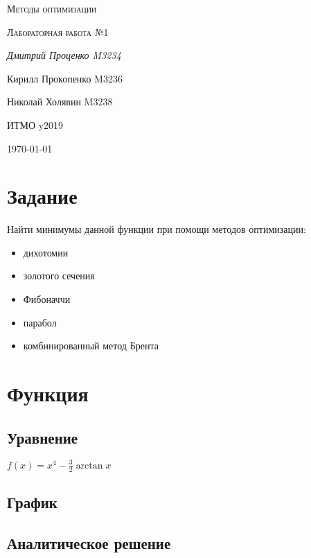 \documentclass[russian, english]{article}
\begin{document}
\begin{titlepage}
\centering
	{\scshape\LARGE Методы оптимизации \par}
	\vspace{1cm}
	{\scshape\Large Лабораторная работа №1\par}
	\vspace{2cm}
	{\Large\itshape Дмитрий Проценко M3234 \par
	Кирилл Прокопенко M3236 \par
	Николай Холявин M3238 \par}
	\vfill
	ИТМО y2019
	\vfill
	{\large \today\par}
\end{titlepage}

\tableofcontents
\newpage

\section{Задание}
Найти минимумы данной функции при помощи методов оптимизации:
\begin{itemize}
\item дихотомии
\item золотого сечения
\item Фибоначчи
\item парабол
\item комбинированный метод Брента
\end{itemize}

\section{Функция}
\subsection{Уравнение}
$f(x)=x^4-\frac{3}{2}\arctan{x}$

\subsection{График}
\par
{}

\subsection{Аналитическое решение}
\end{document}
